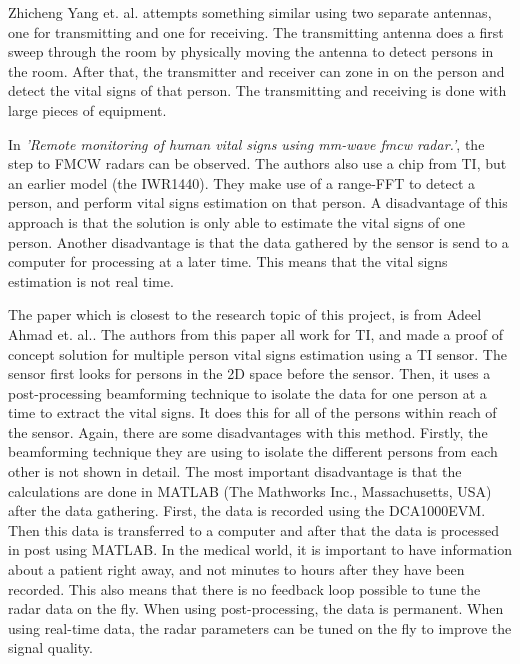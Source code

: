 Zhicheng Yang et. al. \cite{yang2016monitoring} attempts something similar using two separate antennas, one for transmitting and one for receiving. The transmitting antenna does a first sweep through the room by physically moving the antenna to detect persons in the room. After that, the transmitter and receiver can zone in on the person and detect the vital signs of that person. The transmitting and receiving is done with large pieces of equipment. 

In \emph{'Remote monitoring of human vital signs using mm-wave fmcw radar.'}\cite{alizadeh2019remote}, the step to FMCW radars can be observed. The authors also use a chip from TI, but an earlier model (the IWR1440). They make use of a range-FFT to detect a person, and perform vital signs estimation on that person. A disadvantage of this approach is that the solution is only able to estimate the vital signs of one person. Another disadvantage is that the data gathered by the sensor is send to a computer for processing at a later time. This means that the vital signs estimation is not real time. 

The paper which is closest to the research topic of this project, is from Adeel Ahmad et. al.\cite{ahmad2018vital}. The authors from this paper all work for TI, and made a proof of concept solution for multiple person vital signs estimation using a TI sensor. The sensor first looks for persons in the 2D space before the sensor. Then, it uses a post-processing beamforming technique to isolate the data for one person at a time to extract the vital signs. It does this for all of the persons within reach of the sensor. Again, there are some disadvantages with this method. Firstly, the beamforming technique they are using to isolate the different persons from each other is not shown in detail. The most important disadvantage is that the calculations are done in MATLAB (The Mathworks Inc., Massachusetts, USA) after the data gathering. First, the data is recorded using the DCA1000EVM. Then this data is transferred to a computer and after that the data is processed in post using MATLAB. In the medical world, it is important to have information about a patient right away, and not minutes to hours after they have been recorded. This also means that there is no feedback loop possible to tune the radar data on the fly. When using post-processing, the data is permanent. When using real-time data, the radar parameters can be tuned on the fly to improve the signal quality.
